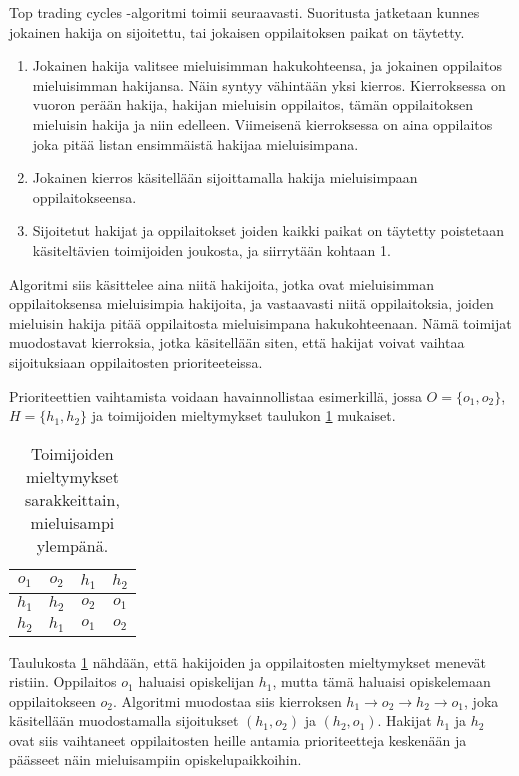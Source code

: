 \documentclass[twoside]{tktltiki}
\begin{document}
Top trading cycles -algoritmi toimii seuraavasti. Suoritusta jatketaan
kunnes jokainen hakija on sijoitettu, tai jokaisen oppilaitoksen
paikat on täytetty.
\begin{enumerate}

\item Jokainen hakija valitsee mieluisimman hakukohteensa, ja jokainen
  oppilaitos mieluisimman hakijansa. Näin syntyy vähintään yksi
  kierros. Kierroksessa on vuoron perään hakija, hakijan mieluisin
  oppilaitos, tämän oppilaitoksen mieluisin hakija ja niin edelleen.
  Viimeisenä kierroksessa on aina oppilaitos joka pitää listan
  ensimmäistä hakijaa mieluisimpana.

\item Jokainen kierros käsitellään sijoittamalla hakija mieluisimpaan
  oppilaitokseensa.

\item Sijoitetut hakijat ja oppilaitokset joiden kaikki paikat on
  täytetty poistetaan käsiteltävien toimijoiden joukosta, ja
  siirrytään kohtaan 1.
\end{enumerate}

Algoritmi siis käsittelee aina niitä hakijoita, jotka ovat
mieluisimman oppilaitoksensa mieluisimpia hakijoita, ja vastaavasti
niitä oppilaitoksia, joiden mieluisin hakija pitää oppilaitosta
mieluisimpana hakukohteenaan. Nämä toimijat muodostavat kierroksia,
jotka käsitellään siten, että hakijat voivat vaihtaa sijoituksiaan
oppilaitosten prioriteeteissa.

Prioriteettien vaihtamista voidaan havainnollistaa esimerkillä, jossa
$O = \{o_1, o_2\}$, $H = \{h_1, h_2\}$ ja toimijoiden mieltymykset
taulukon \ref{top_esimerkki} mukaiset.

\begin{table}[ht]
  \begin{center}
    \begin{tabular}{ c c | c c }
    $o_1$ & $o_2$ & $h_1$ & $h_2$ \\
    \hline
    $h_1$ & $h_2$ & $o_2$ & $o_1$ \\
    $h_2$ & $h_1$ & $o_1$ & $o_2$
    \end{tabular}
    \caption{Toimijoiden mieltymykset sarakkeittain, mieluisampi ylempänä.}
    \label{top_esimerkki}
  \end{center}
\end{table}

Taulukosta \ref{top_esimerkki} nähdään, että hakijoiden ja
oppilaitosten mieltymykset menevät ristiin. Oppilaitos $o_1$ haluaisi
opiskelijan $h_1$, mutta tämä haluaisi opiskelemaan oppilaitokseen
$o_2$. Algoritmi muodostaa siis kierroksen $h_1 \rightarrow o_2
\rightarrow h_2 \rightarrow o_1$, joka käsitellään muodostamalla
sijoitukset $(h_1, o_2)$ ja $(h_2, o_1)$. Hakijat $h_1$ ja $h_2$ ovat
siis vaihtaneet oppilaitosten heille antamia prioriteetteja keskenään
ja päässeet näin mieluisampiin opiskelupaikkoihin.
\end{document}
